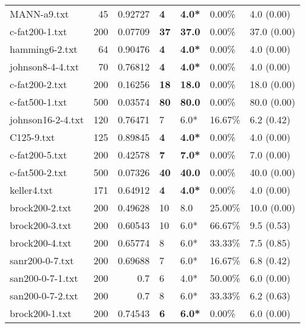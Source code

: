 \begin{table}[h]
\begin{tabular}{lrrllll}
 MANN-a9.txt        &      45 &     0.92727 & \textbf{4}   & \textbf{4.0*}   & 0.00\%   & 4.0 (0.00)     \\
 c-fat200-1.txt     &     200 &     0.07709 & \textbf{37}  & \textbf{37.0}   & 0.00\%   & 37.0 (0.00)    \\
 hamming6-2.txt     &      64 &     0.90476 & \textbf{4}   & \textbf{4.0*}   & 0.00\%   & 4.0 (0.00)     \\
 johnson8-4-4.txt   &      70 &     0.76812 & \textbf{4}   & \textbf{4.0*}   & 0.00\%   & 4.0 (0.00)     \\
 c-fat200-2.txt     &     200 &     0.16256 & \textbf{18}  & \textbf{18.0}   & 0.00\%   & 18.0 (0.00)    \\
 c-fat500-1.txt     &     500 &     0.03574 & \textbf{80}  & \textbf{80.0}   & 0.00\%   & 80.0 (0.00)    \\
 johnson16-2-4.txt  &     120 &     0.76471 & 7            & 6.0*            & 16.67\%  & 6.2 (0.42)     \\
 C125-9.txt         &     125 &     0.89845 & \textbf{4}   & \textbf{4.0*}   & 0.00\%   & 4.0 (0.00)     \\
 c-fat200-5.txt     &     200 &     0.42578 & \textbf{7}   & \textbf{7.0*}   & 0.00\%   & 7.0 (0.00)     \\
 c-fat500-2.txt     &     500 &     0.07326 & \textbf{40}  & \textbf{40.0}   & 0.00\%   & 40.0 (0.00)    \\
 keller4.txt        &     171 &     0.64912 & \textbf{4}   & \textbf{4.0*}   & 0.00\%   & 4.0 (0.00)     \\
 brock200-2.txt     &     200 &     0.49628 & 10           & 8.0             & 25.00\%  & 10.0 (0.00)    \\
 brock200-3.txt     &     200 &     0.60543 & 10           & 6.0*            & 66.67\%  & 9.5 (0.53)     \\
 brock200-4.txt     &     200 &     0.65774 & 8            & 6.0*            & 33.33\%  & 7.5 (0.85)     \\
 sanr200-0-7.txt    &     200 &     0.69688 & 7            & 6.0*            & 16.67\%  & 6.8 (0.42)     \\
 san200-0-7-1.txt   &     200 &     0.7     & 6            & 4.0*            & 50.00\%  & 6.0 (0.00)     \\
 san200-0-7-2.txt   &     200 &     0.7     & 8            & 6.0*            & 33.33\%  & 6.2 (0.63)     \\
 brock200-1.txt     &     200 &     0.74543 & \textbf{6}   & \textbf{6.0*}   & 0.00\%   & 6.0 (0.00)     \\

\end{tabular}
\end{table}
